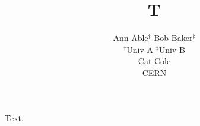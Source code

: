 \documentclass{article}
\title{T}
\author{Ann Able$^{\dagger}$ \quad Bob Baker$^{\ddagger}$ \\ $^\dagger$Univ A \quad $^\ddagger$Univ B \\ Cat Cole \\ CERN}
\begin{document}
\maketitle
Text.
\end{document}
